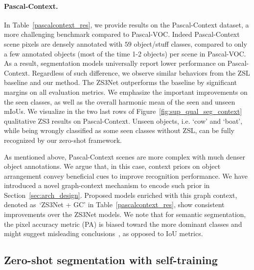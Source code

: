 \documentclass{article}
\begin{document}
\vspace{-0.3cm}


\paragraph{Pascal-Context.}
In Table~\ref{pascalcontext_res}, we provide results on the Pascal-Context dataset, a more challenging benchmark compared to Pascal-VOC.
Indeed Pascal-Context scene pixels are densely annotated with $59$ object/stuff classes, compared to only a few annotated objects (most of the time 1-2 objects) per scene in Pascal-VOC.
As a result, segmentation models universally report lower performance on Pascal-Context.
Regardless of such difference, we observe similar behaviors from the ZSL baseline and our method.
The ZS3Net outperforms the baseline by significant margins on all evaluation metrics.
We emphasize the important improvements on the seen classes, as well as the overall harmonic mean of the seen and unseen mIoUs. We visualize in the two last rows of Figure~\ref{fig:sup_qual_seg_context} qualitative ZS3 results on Pascal-Context.
Unseen objects, i.e. `cow' and `boat', while being wrongly classified as some seen classes without ZSL, can be fully recognized by our zero-shot framework.

As mentioned above, Pascal-Context scenes are more complex with much denser object annotations.
We argue that, in this case, context priors on object arrangement convey beneficial cues to improve recognition performance.
We have introduced a novel graph-context mechanism to encode such prior in Section~\ref{sec:arch_design}.
Proposed models enriched with this graph context, denoted as~`ZS3Net + GC' in Table~\ref{pascalcontext_res}, show consistent improvements over the ZS3Net models.
We note that for semantic segmentation, the pixel accuracy metric (PA) is biased toward the more dominant classes and might suggest misleading conclusions~\cite{csurka2013good}, as opposed to IoU metrics. 


\subsection{Zero-shot segmentation with self-training}\label{sec:self_training_results}
\end{document}
